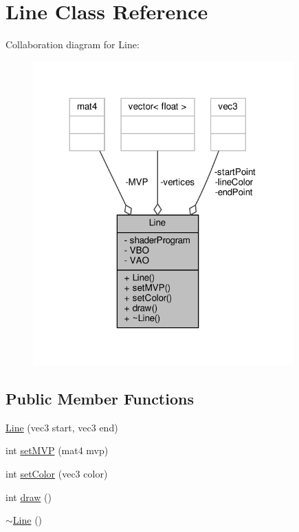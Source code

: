 \hypertarget{classLine}{}\section{Line Class Reference}
\label{classLine}


Collaboration diagram for Line\+:
\nopagebreak
\begin{figure}[H]
\begin{center}
\leavevmode
\includegraphics[width=284pt]{classLine__coll__graph}
\end{center}
\end{figure}
\subsection*{Public Member Functions}
\begin{DoxyCompactItemize}
\item 
\hyperlink{classLine_aae4b6f0aa93bf671632a9c932ce81164}{Line} (vec3 start, vec3 end)
\item 
int \hyperlink{classLine_a3ccc376f8f6fadaa88d9e6687a179a45}{set\+M\+VP} (mat4 mvp)
\item 
int \hyperlink{classLine_ac1cf708f780fe795ac17939dd9aa44e2}{set\+Color} (vec3 color)
\item 
int \hyperlink{classLine_ac12e023f79f63cf502683e82c47ba9d8}{draw} ()
\item 
\hyperlink{classLine_aabe85f48d22d92b62257091f48174fac}{$\sim$\+Line} ()
\end{DoxyCompactItemize}
